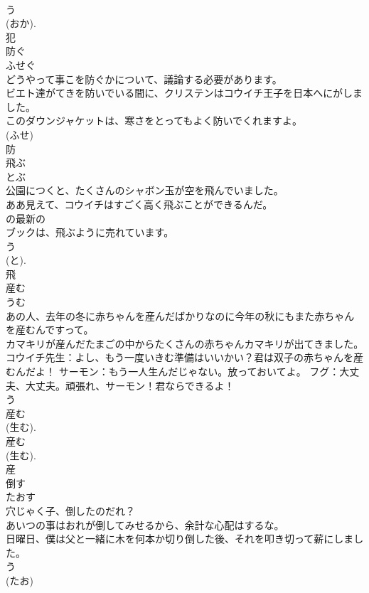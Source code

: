 \documentclass[8pt]{extreport}
\begin{document}
\begin{CJK}{UTF8}{min}
\\	う 
\\	(おか). 
\\	犯	
\\	防ぐ	
\\	ふせぐ	
\\	どうやって事こを防ぐかについて、議論する必要があります。	
\\	ビエト達がてきを防いでいる間に、クリステンはコウイチ王子を日本へにがしました。	
\\	このダウンジャケットは、寒さをとってもよく防いでくれますよ。	
\\	(ふせ) 
\\	防	
\\	飛ぶ	
\\	とぶ	
\\	公園につくと、たくさんのシャボン玉が空を飛んでいました。	
\\	ああ見えて、コウイチはすごく高く飛ぶことができるんだ。	
\\	の最新の
\\	ブックは、飛ぶように売れています。	
\\	う 
\\	(と). 
\\	飛	
\\	産む	
\\	うむ	
\\	あの人、去年の冬に赤ちゃんを産んだばかりなのに今年の秋にもまた赤ちゃんを産むんですって。	
\\	カマキリが産んだたまごの中からたくさんの赤ちゃんカマキリが出てきました。	
\\	コウイチ先生：よし、もう一度いきむ準備はいいかい？君は双子の赤ちゃんを産むんだよ！ サーモン：もう一人生んだじゃない。放っておいてよ。 フグ：大丈夫、大丈夫。頑張れ、サーモン！君ならできるよ！	
\\	う 
\\	産む 
\\	(生む). 
\\	産む 
\\	(生む). 
\\	産	
\\	倒す	
\\	たおす	
\\	穴じゃく子、倒したのだれ？	
\\	あいつの事はおれが倒してみせるから、余計な心配はするな。	
\\	日曜日、僕は父と一緒に木を何本か切り倒した後、それを叩き切って薪にしました。	
\\	う 
\\	(たお) 

\end{CJK}
\end{document}
